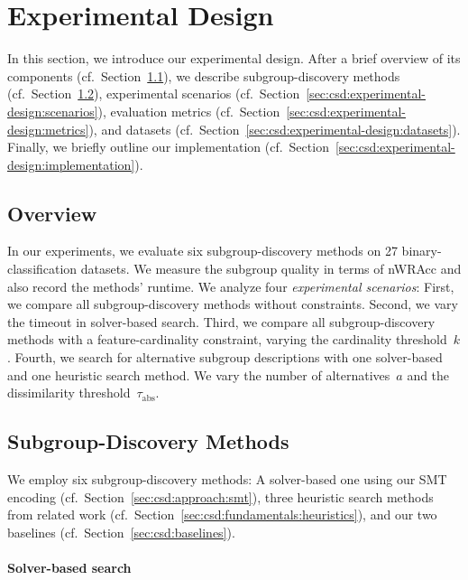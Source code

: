 \documentclass{article}
\theoremstyle{definition}
\begin{document}
\section{Experimental Design}
\label{sec:csd:experimental-design}

In this section, we introduce our experimental design.
After a brief overview of its components (cf.~Section~\ref{sec:csd:experimental-design:overview}), we describe subgroup-discovery methods (cf.~Section~\ref{sec:csd:experimental-design:methods}), experimental scenarios (cf.~Section~\ref{sec:csd:experimental-design:scenarios}), evaluation metrics (cf.~Section~\ref{sec:csd:experimental-design:metrics}), and datasets (cf.~Section~\ref{sec:csd:experimental-design:datasets}).
Finally, we briefly outline our implementation (cf.~Section~\ref{sec:csd:experimental-design:implementation}).

\subsection{Overview}
\label{sec:csd:experimental-design:overview}

In our experiments, we evaluate six subgroup-discovery methods on 27 binary-classification datasets.
We measure the subgroup quality in terms of nWRAcc and also record the methods' runtime.
We analyze four \emph{experimental scenarios}:
First, we compare all subgroup-discovery methods without constraints.
Second, we vary the timeout in solver-based search.
Third, we compare all subgroup-discovery methods with a feature-cardinality constraint, varying the cardinality threshold~$k$.
Fourth, we search for alternative subgroup descriptions with one solver-based and one heuristic search method.
We vary the number of alternatives~$a$ and the dissimilarity threshold~$\tau_{\text{abs}}$.

\subsection{Subgroup-Discovery Methods}
\label{sec:csd:experimental-design:methods}

We employ six subgroup-discovery methods:
A solver-based one using our SMT encoding (cf.~Section~\ref{sec:csd:approach:smt}), three heuristic search methods from related work (cf.~Section~\ref{sec:csd:fundamentals:heuristics}), and our two baselines (cf.~Section~\ref{sec:csd:baselines}).

\paragraph{Solver-based search}
\end{document}
